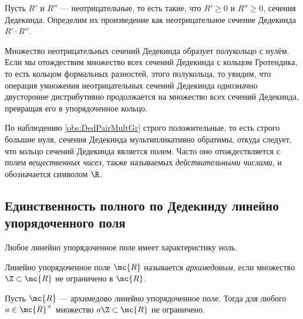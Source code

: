 \documentclass[
	extrafontsizes,
	11pt,
	hyphens,
]{memoir}
\begin{document}
\begin{definition}
Пусть \(R'\) и \(R''\) --- неотрицательные, то есть такие, что \(R' \geq 0\) и \(R'' \geq 0\), сечения Дедекинда.
Определим их произведение как неотрицательное сечение Дедекинда
\(R' \cdot R''\).
\end{definition}

\begin{observation}
Множество неотрицательных сечений Дедекинда образует полукольцо с нулём. Если мы отождествим множество всех сечений Дедекинда с кольцом Гротендика, то есть кольцом формальных разностей, этого полукольца, то увидим, что операция умножения
неотрицательных сечений Дедекинда
однозначно двусторонне дистрибутивно продолжается на множество всех сечений Дедекинда, превращая его в упорядоченное кольцо.
\end{observation}

\begin{observation}
По наблюдению \ref{obs:DedPairMultGr} строго положительные, то есть строго большие нуля, сечения Дедекинда мультипликативно обратимы, откуда следует, что кольцо сечений Дедекинда является полем.
Часто оно отождествляется с полем \emph{вещественных чисел}, также называемых \emph{действительными числами}, и обозначается символом \(\R\).
\end{observation}

\subsection{Единственность полного по Дедекинду линейно упорядоченного поля}

\begin{observation}
Любое линейно упорядоченное поле имеет характеристику ноль.
\end{observation}

\begin{definition}[\scshape Архимедово поле]
Линейно упорядоченное поле \(\mc{R}\) называется \emph{архимедовым}, если множество \(\Z \subset \mc{R}\) не ограничено в \(\mc{R}\).
\end{definition}

\begin{observation}
\label{obs:ArchField1}
Пусть \(\mc{R}\) --- архимедово линейно упорядоченное поле.
Тогда для любого \(a \in \mc{R}^\times\) множество \(a \Z \subset \mc{R}\) не ограничено.
\end{observation}
\end{document}
